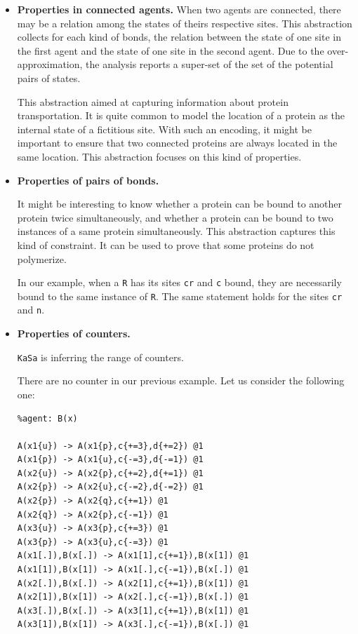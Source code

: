 \documentclass[11pt]{book}
\def\ttt#1{\texttt{#1}}
\begin{document}
\begin{itemize}
\item \textbf{Properties in connected agents.}
When two agents are connected, there may be a relation among the states of theirs respective sites.  This abstraction \cite{Feret:SASB2016} collects for each kind of bonds, the relation between the state of one site in the first agent and the state of one site in the second agent.  Due to the over-approximation, the analysis reports a super-set of the set of the potential pairs of states.

This abstraction aimed at capturing information about protein transportation.
It is quite common to model the location of a protein as the internal state of  a fictitious site. With such an encoding, it might be important to ensure that two connected proteins are always located in the same location. This abstraction focuses on this kind of properties.

\item \textbf{Properties of pairs of bonds.}

It might be interesting to know whether a protein can be bound to another protein twice simultaneously, and whether a protein can be bound to two instances of a same protein simultaneously. This abstraction \cite{Feret:SASB2016} captures this kind of constraint. It can be used to prove that some proteins do not polymerize.

In our example, when a \texttt{R} has its sites \texttt{cr} and \texttt{c} bound, they are necessarily bound to the same instance of \texttt{R}. The same statement holds for the sites \texttt{cr} and \texttt{n}.

\item \textbf{Properties of counters.}

\ttt{KaSa} is inferring the range of counters.

There are no counter in our previous example.
Let us consider the following one:
\begin{lstlisting}[language=kappa]
%agent:	A(x1{u p},x2{u p q},x3{u p},c{=0},d{=0})
%agent: B(x)

A(x1{u}) -> A(x1{p},c{+=3},d{+=2}) @1
A(x1{p}) -> A(x1{u},c{-=3},d{-=1}) @1
A(x2{u}) -> A(x2{p},c{+=2},d{+=1}) @1
A(x2{p}) -> A(x2{u},c{-=2},d{-=2}) @1
A(x2{p}) -> A(x2{q},c{+=1}) @1
A(x2{q}) -> A(x2{p},c{-=1}) @1
A(x3{u}) -> A(x3{p},c{+=3}) @1
A(x3{p}) -> A(x3{u},c{-=3}) @1
A(x1[.]),B(x[.]) -> A(x1[1],c{+=1}),B(x[1]) @1
A(x1[1]),B(x[1]) -> A(x1[.],c{-=1}),B(x[.]) @1
A(x2[.]),B(x[.]) -> A(x2[1],c{+=1}),B(x[1]) @1
A(x2[1]),B(x[1]) -> A(x2[.],c{-=1}),B(x[.]) @1
A(x3[.]),B(x[.]) -> A(x3[1],c{+=1}),B(x[1]) @1
A(x3[1]),B(x[1]) -> A(x3[.],c{-=1}),B(x[.]) @1


\end{lstlisting}
\end{itemize}
\end{document}
